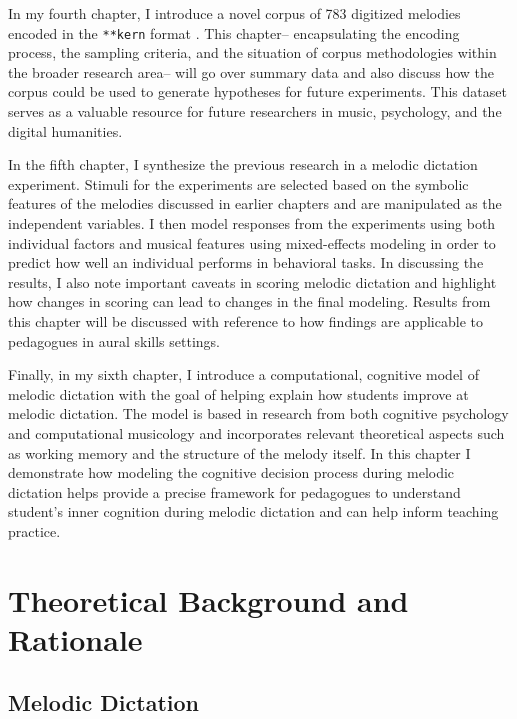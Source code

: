 \documentclass[]{book}
\begin{document}
In my fourth chapter, I introduce a novel corpus of 783 digitized melodies encoded in the \texttt{**kern}
format \citep{huronHumdrumToolkitReference1994}.
This chapter-- encapsulating the encoding process, the sampling criteria, and the situation of corpus methodologies within the broader research area-- will go over summary data and also discuss how the corpus could be used to generate hypotheses for future experiments.
This dataset serves as a valuable resource for future researchers in music, psychology, and the digital humanities.

In the fifth chapter, I synthesize the previous research in a melodic dictation experiment.
Stimuli for the experiments are selected based on the symbolic features of the melodies discussed in earlier chapters and are manipulated as the independent variables.
I then model responses from the experiments using both individual factors and musical features using mixed-effects modeling in order to predict how well an individual performs in behavioral tasks.
In discussing the results, I also note important caveats in scoring melodic dictation and highlight how changes in scoring can lead to changes in the final modeling.
Results from this chapter will be discussed with reference to how findings are applicable to pedagogues in aural skills settings.

Finally, in my sixth chapter, I introduce a computational, cognitive model of melodic dictation with the goal of helping explain how students improve at melodic dictation.
The model is based in research from both cognitive psychology \citep{cowanMagicalMysteryFour2010} and computational musicology \citep{pearceStatisticalLearningProbabilistic2018a} and incorporates relevant theoretical aspects such as working memory \citep{chenetteReframingAuralSkills2019, vanhandelRoleWorkingMemory2011} and the structure of the melody itself.
In this chapter I demonstrate how modeling the cognitive decision process during melodic dictation helps provide a precise framework for pedagogues to understand student's inner cognition during melodic dictation and can help inform teaching practice.

\hypertarget{intro}{%
\chapter{Theoretical Background and Rationale}\label{intro}}

\hypertarget{melodic-dictation}{%
\section{Melodic Dictation}\label{melodic-dictation}}
\end{document}
